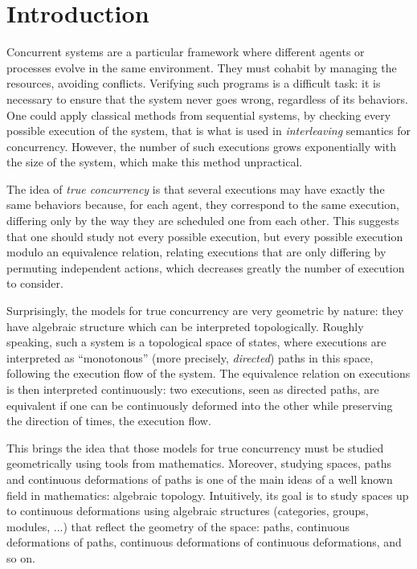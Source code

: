 \chapter*{Introduction}
\label{chap:intro}



Concurrent systems are a particular framework where different agents or processes evolve in the same environment. They must cohabit by managing the resources, avoiding conflicts. Verifying such programs is a difficult task: it is necessary to ensure that the system never goes wrong, regardless of its behaviors. One could apply classical methods from sequential systems, by checking every possible execution of the system, that is what is used in \emph{interleaving} semantics for concurrency. However, the number of such executions grows exponentially with the size of the system, which make this method unpractical. 

The idea of \emph{true concurrency} is that several executions may have exactly the same behaviors because, for each agent, they correspond to the same execution, differing only by the way they are scheduled one from each other. This suggests that one should study not every possible execution, but every possible execution modulo an equivalence relation, relating executions that are only differing by permuting independent actions, which decreases greatly the number of execution to consider.

Surprisingly, the models for true concurrency are very geometric by nature: they have algebraic structure which can be interpreted topologically. Roughly speaking, such a system is a topological space of states, where executions are interpreted as ``monotonous'' (more precisely, \emph{directed}) paths in this space, following the execution flow of the system. The equivalence relation on executions is then interpreted continuously: two executions, seen as directed paths, are equivalent if one can be continuously deformed into the other while preserving the direction of times, the execution flow.

This brings the idea that those models for true concurrency must be studied geometrically using tools from mathematics. Moreover, studying spaces, paths and continuous deformations of paths is one of the main ideas of a well known field in mathematics: algebraic topology. Intuitively, its goal is to study spaces up to continuous deformations using algebraic structures (categories, groups, modules, ...) that reflect the geometry of the space: paths, continuous deformations of paths, continuous deformations of continuous deformations, and so on.

